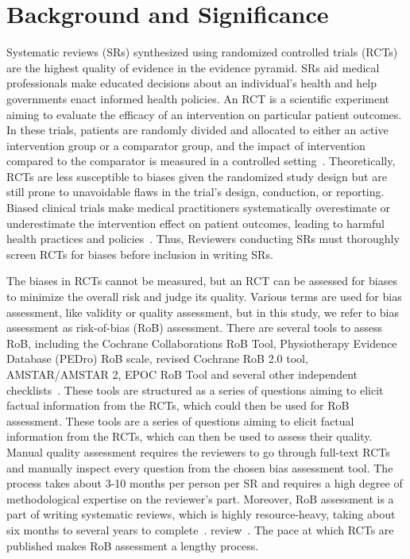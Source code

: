 \documentclass[sn-mathphys,Numbered]{sn-jnl}%
\theoremstyle{thmstyleone}%
\theoremstyle{thmstyletwo}%
\theoremstyle{thmstylethree}%
\begin{document}
\section{Background and Significance}
\label{sec:background}
%
Systematic reviews (SRs) synthesized using randomized controlled trials (RCTs) are the highest quality of evidence in the evidence pyramid.
SRs aid medical professionals make educated decisions about an individual's health and help governments enact informed health policies.
An RCT is a scientific experiment aiming to evaluate the efficacy of an intervention on particular patient outcomes.
In these trials, patients are randomly divided and allocated to either an active intervention group or a comparator group, and the impact of intervention compared to the comparator is measured in a controlled setting~\cite{sibbald1998understanding}.
Theoretically, RCTs are less susceptible to biases given the randomized study design but are still prone to unavoidable flaws in the trial's design, conduction, or reporting.
Biased clinical trials make medical practitioners systematically overestimate or underestimate the intervention effect on patient outcomes, leading to harmful health practices and policies~\cite{kjaergard1999randomized,naci2019design}.
Thus, Reviewers conducting SRs must thoroughly screen RCTs for biases before inclusion in writing SRs.


The biases in RCTs cannot be measured, but an RCT can be assessed for biases to minimize the overall risk and judge its quality.
Various terms are used for bias assessment, like validity or quality assessment, but in this study, we refer to bias assessment as risk-of-bias (RoB) assessment.
There are several tools to assess RoB, including the Cochrane Collaborations RoB Tool, Physiotherapy Evidence Database (PEDro) RoB scale, revised Cochrane RoB 2.0 tool, AMSTAR/AMSTAR 2, EPOC RoB Tool and several other independent checklists~\cite{higgins2011cochrane,elkins2013growth,sterne2019rob,shea2017amstar,farrah2019risk}.
These tools are structured as a series of questions aiming to elicit factual information from the RCTs, which could then be used for RoB assessment.
These tools are a series of questions aiming to elicit factual information from the RCTs, which can then be used to assess their quality.
Manual quality assessment requires the reviewers to go through full-text RCTs and manually inspect every question from the chosen bias assessment tool.
The process takes about 3-10 months per person per SR and requires a high degree of methodological expertise on the reviewer's part.
Moreover, RoB assessment is a part of writing systematic reviews, which is highly resource-heavy, taking about six months to several years to complete~\cite{tsertsvadze2015conduct, khangura2012evidence}.
review~\cite{higgins2019cochrane}.
The pace at which RCTs are published makes RoB assessment a lengthy process.
\end{document}

